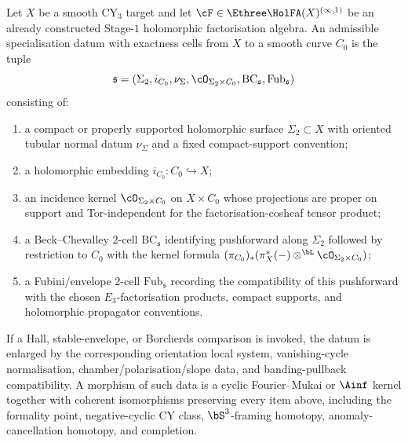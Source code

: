 \begin{definition}
\label{def:witnessed-admissible-specialisation-datum}
Let $X$ be a smooth CY$_3$ target and let
$\cF\in\Ethree\HolFA(X)^{(\infty,1)}$ be an already constructed
Stage-$1$ holomorphic factorisation algebra. An admissible
specialisation datum with exactness cells from $X$ to a smooth curve $C_0$ is the tuple
\[
 \mathfrak s=(\Sigma_2,i_{C_0},\nu_{\Sigma},\cO_{\Sigma_2\times C_0},
 \mathrm{BC}_{\mathfrak s},\mathrm{Fub}_{\mathfrak s})
\]
consisting of:
\begin{enumerate}[label=\textup{(\roman*)}]
\item a compact or properly supported holomorphic surface
$\Sigma_2\subset X$ with oriented tubular normal datum
$\nu_{\Sigma}$ and a fixed compact-support convention;
\item a holomorphic embedding $i_{C_0}\colon C_0\hookrightarrow X$;
\item an incidence kernel $\cO_{\Sigma_2\times C_0}$ on
$X\times C_0$ whose projections are proper on support and
Tor-independent for the factorisation-cosheaf tensor product;
\item a Beck--Chevalley $2$-cell $\mathrm{BC}_{\mathfrak s}$ identifying
pushforward along $\Sigma_2$ followed by restriction to $C_0$ with the
kernel formula
$(\pi_{C_0})_*(\pi_X^*(-)\otimes^{\bL}\cO_{\Sigma_2\times C_0})$;
\item a Fubini/envelope $2$-cell $\mathrm{Fub}_{\mathfrak s}$ recording
the compatibility of this pushforward with the chosen
$E_3$-factorisation products, compact supports, and holomorphic
propagator conventions.
\end{enumerate}
If a Hall, stable-envelope, or Borcherds comparison is invoked, the
datum is enlarged by the corresponding orientation local system,
vanishing-cycle normalisation, chamber/polarisation/slope data, and
banding-pullback compatibility. A morphism of such data is a
cyclic Fourier--Mukai or $\Ainf$ kernel together with coherent
isomorphisms preserving every item above, including the formality point,
negative-cyclic CY class, $\bS^3$-framing homotopy,
anomaly-cancellation homotopy, and completion.
\end{definition}

